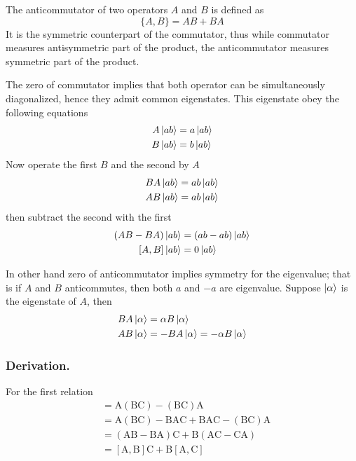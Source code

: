 \documentclass[../../../main.tex]{subfiles}
\begin{document}
The anticommutator of two operators \( A \) and \( B \) is defined as 
\begin{equation*}
	\{ A, B \} = AB + BA
\end{equation*}
It is the symmetric counterpart of the commutator, thus while commutator measures antisymmetric part of the product, the anticommutator measures symmetric part of the product.

The zero of commutator implies that both operator can be simultaneously diagonalized, hence they admit common eigenstates.
This eigenstate obey the following equations
\begin{align*}
    A \ket{ab} & = a \ket{ab}  \\
    B\ket{ab} & = b \ket{ab}
\end{align*}
Now operate the first $B$ and the second by $A$
\begin{align*}
    BA \ket{ab} & = ab \ket{ab} \\
    AB\ket{ab}  & = ab \ket{ab}
\end{align*}
then subtract the second with the first
\begin{align*}
    (AB-BA)\ket{ab} & = (ab-ab)\ket{ab} \\
    [A,B]\ket{ab}              & = 0 \ket{ab}
\end{align*}

In other hand zero of anticommutator implies symmetry for the eigenvalue; that is if $A$ and $B$ anticommutes, then both $a$ and $-a$ are eigenvalue.
Suppose $\ket{\alpha}$ is the eigenstate of $A$, then 
\begin{align*}
	BA \ket{\alpha} &=  \alpha B \ket{\alpha}\\
	AB \ket{\alpha} &= -BA \ket{\alpha} = -\alpha B \ket{\alpha}
\end{align*} 

\subsubsection{Derivation.}
For the first relation
\begin{align*}
[\mathrm{A}, \mathrm{B}\mathrm{C}] &=  \mathrm{A}(\mathrm{B}\mathrm{C}) - (\mathrm{B}\mathrm{C})\mathrm{A}\\
&=  \mathrm{A}(\mathrm{B}\mathrm{C}) - \mathrm{B}\mathrm{A}\mathrm{C} + \mathrm{B}\mathrm{A}\mathrm{C} - (\mathrm{B}\mathrm{C})\mathrm{A}\\
&=  (\mathrm{A}\mathrm{B} - \mathrm{B}\mathrm{A})\mathrm{C} + \mathrm{B}(\mathrm{A}\mathrm{C} - \mathrm{C}\mathrm{A})\\
&=  [\mathrm{A}, \mathrm{B}]\mathrm{C} + \mathrm{B}[\mathrm{A}, \mathrm{C}]
\end{align*}
\end{document}
